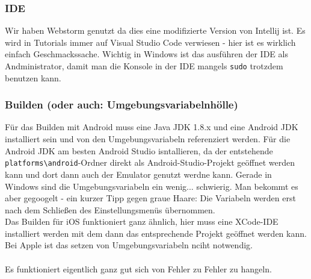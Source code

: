 \subsubsection*{IDE}
Wir haben Webstorm genutzt da dies eine modifizierte Version von Intellij ist. Es wird in Tutorials immer auf Visual Studio Code verwiesen - hier ist es wirklich einfach Geschmackssache. Wichtig in Windows ist das ausführen der IDE als Andministrator, damit man die Konsole in der IDE mangels \verb|sudo| trotzdem benutzen kann.

\subsubsection*{Builden (oder auch: Umgebungsvariabelnhölle)}
Für das Builden mit Android muss eine Java JDK 1.8.x und eine Android JDK installiert sein und von den Umgebungsvariabeln referenziert werden. Für die Android JDK am besten Android Studio isntallieren, da der entstehende \verb|platforms\android|-Ordner direkt als Android-Studio-Projekt geöffnet werden kann und dort dann auch der Emulator genutzt werdne kann. Gerade in Windows sind die Umgebungsvariabeln ein wenig... schwierig. Man bekommt es aber gegoogelt - ein kurzer Tipp gegen graue Haare: Die Variabeln werden erst nach dem Schließen des Einstellungsmenüs übernommen.\\Das Builden für iOS funktioniert ganz ähnlich, hier muss eine XCode-IDE installiert werden mit dem dann das entsprechende Projekt geöffnet werden kann. Bei Apple ist das setzen von Umgebungsvariabeln nciht notwendig.\\\\Es funktioniert eigentlich ganz gut sich von Fehler zu Fehler zu hangeln.